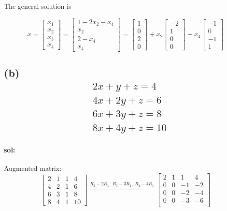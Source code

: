 \documentclass{article}
\begin{document}
	The general solution is
	
	\[
	x=
	\left[
		\begin{array}{c}
			x_1\\
			x_2\\
			x_3\\
			x_4
		\end{array}
	\right]
	=
	\left[
		\begin{array}{c}
			1-2x_2-x_4\\
			x_2\\
			2-x_4\\
			x_4
		\end{array}
	\right]
	=
	\left[
		\begin{array}{c}
			1\\
			0\\
			2\\
			0
		\end{array}
	\right]
	+x_2
	\left[
		\begin{array}{c}
			-2\\
			1\\
			0\\
			0
		\end{array}
	\right]
	+x_4
	\left[
		\begin{array}{c}
			-1\\
			0\\
			-1\\
			1
		\end{array}
	\right]
	\]
	
	\subsection*{(b)
		\begin{align*}
			&2x+y+z=4\\		
			&4x+2y+z=6\\	
			&6x+3y+z=8\\
			&8x+4y+z=10
		\end{align*}
	}
		
	\paragraph{sol:}
	Augmented matrix:
	\[
	\left[
		\begin{array}{lll|l}
			2 & 1 & 1 & 4\\
			4 & 2 & 1 & 6\\
			6 & 3 & 1 & 8\\
			8 & 4 & 1 & 10
		\end{array}
	\right]
	\xrightarrow{R_2-2R_1,\ R_3-3R_1,\ R_4-4R_1}
	\left[
		\begin{array}{ccc|c}
			2 & 1 & 1 & 4\\
			0 & 0 & -1 & -2\\
			0 & 0 & -2 & -4\\
			0 & 0 & -3 & -6\\
		\end{array}
	\right]
	\]
	
\end{document}
